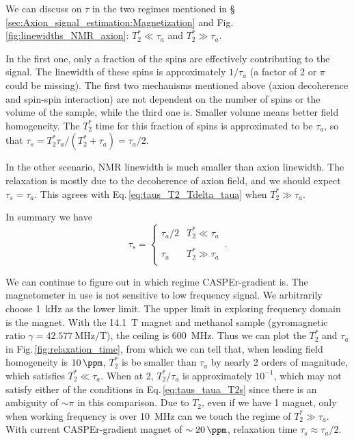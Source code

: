 We can discuss on $\tau$ in the two regimes mentioned in \S\,\ref{sec:Axion_signal_estimation:Magnetization} and Fig.\,\ref{fig:linewidths_NMR_axion}: $T_2^* \ll \tau_a$ and $T_2^* \gg \tau_a$. 

In the first one, only a fraction of the spins are effectively contributing to the signal. The linewidth of these spins is approximately $1/\tau_a$ (a factor of 2 or $\pi$ could be missing). The first two mechanisms mentioned above (axion decoherence and spin-spin interaction) are not dependent on the number of spins or the volume of the sample, while the third one is. Smaller volume means better field homogeneity. 
The $T_2^*$ time for this fraction of spins is approximated to be $\tau_a$, so that $\tau_s = T_2^* \tau_a/(T_2^* + \tau_a) = \tau_a/2$. %

In the other scenario, NMR linewidth is much smaller than axion linewidth. The relaxation is mostly due to the decoherence of axion field, and we should expect $\tau_s = \tau_a$. This agrees with Eq.\,\eqref{eq:taus_T2_Tdelta_taua} when $T_2^* \gg \tau_a$. 

In summary we have
\begin{equation}
    \tau_s = \left\{
    \begin{array}{cl}
    \tau_a/2 & T_2^* \ll \tau_a\\
      & \\
    \tau_a & T_2^* \gg \tau_a\\
    \end{array} \right.\,.\label{eq:taus_taua_T2s}
\end{equation}

We can continue to figure out in which regime CASPEr-gradient is. The magnetometer in use is not sensitive to low frequency signal. We arbitrarily choose \SI{1}{\kHz} as the lower limit. The upper limit in exploring frequency domain is the magnet. With the \SI{14.1}{\tesla} magnet and methanol sample (gyromagnetic ratio $\gamma = \SI{42.577}{\MHz/\tesla}$), the ceiling is \SI{600}{\MHz}. Thus we can plot the $T_2^*$ and $\tau_a$ in Fig.\,\ref{fig:relaxation_time}, from which we can tell that, when leading field homogeneity is $\SI{10}{\ppm}$, $T_2^*$ is be smaller than $\tau_a$ by nearly 2 orders of magnitude, which satisfies $T_2^* \ll \tau_a$. When at \SI{2}{\ppm}, $T_2^*/\tau_a$ is approximately $10^{-1}$, which may not satisfy either of the conditions in Eq.\,\eqref{eq:taus_taua_T2s} since there is an ambiguity of $\sim \pi$ in this comparison. Due to $T_2$, even if we have \SI{1}{\ppb} magnet, only when working frequency is over \SI{10}{\MHz} can we touch the regime of $T_2^* \gg \tau_a$. 
With current CASPEr-gradient magnet of $\sim \SI{20}{\ppm}$, relaxation time $\tau_s \approx \tau_a/2$. 

